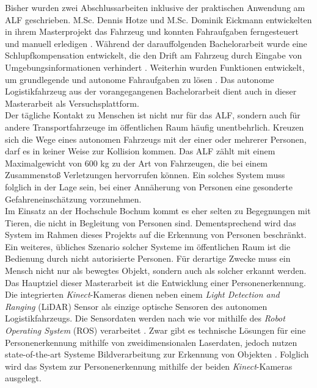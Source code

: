 		Bisher wurden zwei Abschlussarbeiten inklusive der praktischen Anwendung am ALF geschrieben. M.Sc. Dennis Hotze und M.Sc. Dominik Eickmann entwickelten in ihrem Masterprojekt das Fahrzeug und konnten Fahraufgaben ferngesteuert und manuell erledigen \cite{alf}. Während der darauffolgenden Bachelorarbeit wurde eine Schlupfkompensation entwickelt, die den Drift am Fahrzeug durch Eingabe von Umgebungsinformationen verhindert \cite{Bachelorarbeit}. Weiterhin wurden Funktionen entwickelt, um grundlegende und autonome Fahraufgaben zu lösen \cite{Bachelorarbeit}. Das autonome Logistikfahrzeug aus der vorangegangenen Bachelorarbeit dient auch in dieser Masterarbeit als Versuchsplattform.\\
		
		Der tägliche Kontakt zu Menschen ist nicht nur für das ALF, sondern auch für andere Transportfahrzeuge im öffentlichen Raum häufig unentbehrlich. Kreuzen sich die Wege eines autonomen Fahrzeugs mit der einer oder mehrerer Personen, darf es in keiner Weise zur Kollision kommen. Das ALF zählt mit einem Maximalgewicht von 600 kg zu der Art von Fahrzeugen, die bei einem Zusammenstoß Verletzungen hervorrufen können. Ein solches System muss folglich in der Lage sein, bei einer Annäherung von Personen eine gesonderte Gefahreneinschätzung vorzunehmen.\\
		
		Im Einsatz an der Hochschule Bochum kommt es eher selten zu Begegnungen mit Tieren, die nicht in Begleitung von Personen sind. Dementsprechend wird das System im Rahmen dieses Projekts auf die Erkennung von Personen beschränkt. Ein weiteres, übliches Szenario solcher Systeme im öffentlichen Raum ist die Bedienung durch nicht autorisierte Personen. Für derartige Zwecke muss ein Mensch nicht nur als bewegtes Objekt, sondern auch als solcher erkannt werden. \\
		
		Das Hauptziel dieser Masterarbeit ist die Entwicklung einer Personenerkennung. Die integrierten \textit{Kinect}-Kameras dienen neben einem \textit{Light Detection and Ranging} (LiDAR) Sensor als einzige optische Sensoren des autonomen Logistikfahrzeugs. Die Sensordaten werden nach wie vor mithilfe des \textit{Robot Operating System} (ROS) verarbeitet \cite{Bachelorarbeit}. Zwar gibt es technische Lösungen für eine Personenerkennung mithilfe von zweidimensionalen Laserdaten, jedoch nutzen state-of-the-art Systeme Bildverarbeitung zur Erkennung von Objekten \cite{mobilenets, hogsvm}. Folglich wird das System zur Personenerkennung mithilfe der beiden \textit{Kinect}-Kameras ausgelegt. \\
		
